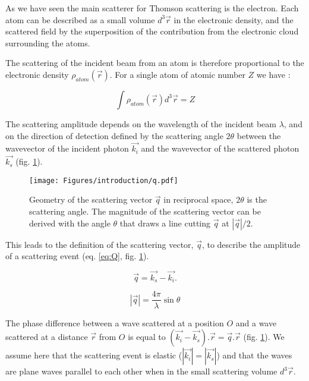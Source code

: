 As we have seen the main scatterer for Thomson scattering is the electron.
Each atom can be described as a small volume $d^3\vec{r}$ in the electronic density, and the scattered field by the superposition of the contribution from the electronic cloud surrounding the atoms.

The scattering of the incident beam from an atom is therefore proportional to the electronic density $\rho_{atom}(\vec{r})$.
For a single atom of atomic number $Z$ we have :

\begin{equation}
    \int \rho_{atom} (\vec{r}) d^3\vec{r} = Z
\end{equation}

The scattering amplitude depends on the wavelength of the incident beam $\lambda$, and on the direction of detection defined by the scattering angle $2\theta$ between the wavevector of the incident photon $\vec{k_i}$ and the wavevector of the scattered photon $\vec{k_s}$ (fig. \ref{fig:q}).

\begin{figure}[!htb]
    \centering
    \texttt{[image: Figures/introduction/q.pdf]}
    \caption{Geometry of the scattering vector $\vec{q}$ in reciprocal space, $2\theta$ is the scattering angle. The magnitude of the scattering vector can be derived with the angle $\theta$ that draws a line cutting $\vec{q}$ at $|\vec{q}|/2$.}
    \label{fig:q}
\end{figure}

This leads to the definition of the scattering vector, $\vec{q}$, to describe the amplitude of a scattering event (eq. \ref{eq:Q}, fig. \ref{fig:q}).

\begin{equation}
    \label{eq:Q}
    \vec{q}=\vec{k_s}-\vec{k_i}.
\end{equation}

\begin{equation}
    \label{eq:QSinTheta}
    |\vec{q}| = \frac{4\pi}{\lambda} \sin{\theta}
\end{equation}

The phase difference between a wave scattered at a position $O
$ and a wave scattered at a distance $\vec{r}$ from $O$ is equal to $(\vec{k_i} - \vec{k_s}).\vec{r} = \vec{q}.\vec{r}$ (fig. \ref{fig:q}).
We assume here that the scattering event is elastic ($|\vec{k_i}|=|\vec{k_s}|$) and that the waves are plane waves parallel to each other when in the small scattering volume $d^3\vec{r}$.

